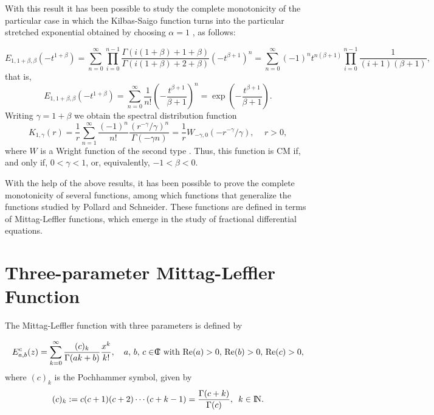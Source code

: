 \documentclass[12pt]{amsart}
\newcommand{\cplex}{{\rm I\hspace{-6pt}C}}
\numberwithin{equation}{section}
\newcommand{\nat}{{\rm I\!N}}
\begin{document}
With this result it has been possible to study the complete monotonicity of the
particular case in which the Kilbas-Saigo function turns into the particular
stretched exponential obtained by choosing $\alpha=1$  \cite{Capelas:2014}, as
follows: 

\begin{equation}
E_{1,1+\beta,\beta}(-t^{1+\beta})=\displaystyle \sum_{n=0}^{\infty}\displaystyle \prod_{i=0}^{n-1} \frac{\Gamma(i(1+\beta)+1+\beta)}{\Gamma(i(1+\beta)+2+\beta)}(-t^{\beta +1})^{n} =\displaystyle \sum_{n=0}^{\infty} (-1)^n t^{n(\beta+1)}\displaystyle \prod_{i=0}^{n-1} \frac{1}{(i+1)(\beta+1)},
\end{equation}
that is, 
\begin{equation}
E_{1,1+\beta,\beta}(-t^{1+\beta})=\displaystyle \sum_{n=0}^{\infty}\frac{1}{n!}\left(-\frac{t^{\beta+1}}{\beta+1}\right)^n=\exp\left(-\frac{t^{\beta+1}}{\beta+1}\right).
\end{equation}
Writing $\gamma=1+\beta$ we obtain the spectral distribution
function 
\begin{equation}
K_{1,\gamma}(r)=\frac{1}{r}\displaystyle\sum_{n=1}^{\infty}\frac{(-1)^n}{n!}\frac{(r^{-\gamma}/\gamma)^n}{\Gamma(-\gamma
n)}=\frac{1}{r}W_{-\gamma,0}(-r^{-\gamma}/\gamma),\,\,\,\,\,\,\,r>0,
\end{equation} 
where $W$ is a Wright function of the second type \cite{Mainardi:2010}.
Thus, this function is CM if, and only if, $0<\gamma<1$, or, equivalently,
$-1<\beta<0$.

With the help of the above results, it has been possible to prove the
complete monotonicity of several functions, among which functions that
generalize the functions studied by Pollard and Schneider. These functions
are defined in terms of Mittag-Leffler functions, which emerge in the study
of fractional differential equations. 

\section{Three-parameter Mittag-Leffler Function} 

The Mittag-Leffler function with three parameters is defined by
\cite{Prabhakar:1971}

\begin{equation}
E_{a,b}^{c}(z)=\sum_{k=0}^{\infty}\frac{(c)_k}{\Gamma(ak+b)}\frac{x^k}{k!},\,\,\,\,\,\,a,\,b,\,c
\in
\cplex\,\,\mbox{with}\,\,\mbox{Re}(a)>0,\,\mbox{Re}(b)>0,\,\mbox{Re}(c)>0,
\label{ml3p}
\end{equation}
where $(c)_k$ is the Pochhammer symbol, given by 
\begin{equation}
	(c)_k:=c(c+1)(c+2)\cdots(c+k-1)=\frac{\Gamma(c+k)}{\Gamma(c)},\,\,\,k\in\nat.
\end{equation}
\end{document}
